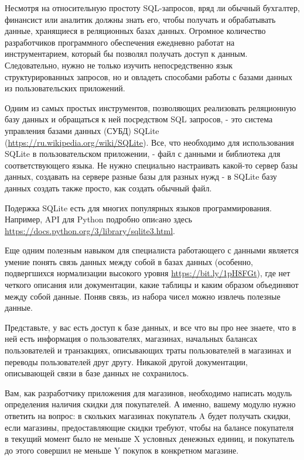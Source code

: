 
Несмотря на относительную простоту SQL-запросов, вряд ли обычный бухгалтер, финансист или аналитик должны знать его, чтобы получать и обрабатывать данные, хранящиеся в реляционных базах данных. Огромное количество разработчиков программного обеспечения ежедневно работат на инструментарием, который бы позволял получать доступ к данным. Следовательно, нужно не только изучить непосредственно язык структурированных запросов, но и овладеть способами работы с базами данных из пользовательских приложений.

Одним из самых простых инструментов, позволяющих реализовать реляционную базу данных и обращаться к 
ней посредством SQL запросов, - это система управления базами данных (СУБД) SQLite (\url{https://ru.wikipedia.org/wiki/SQLite}). Все, что необходимо для использования SQLite в пользовательском приложении, - файл с данными и библиотека для соответствующего языка. Не нужно специально настраивать какой-то сервер базы данных, создавать на сервере разные базы для разных нужд - в SQLite базу данных создать также просто, как создать обычный файл.

Подержка SQLite есть для многих популярных языков программирования. Например, API для Python подробно опиcано здесь\\ 
\url{https://docs.python.org/3/library/sqlite3.html}.

Еще одним полезным навыком для специалиста работающего с данными является умение понять связь данных между 
собой в базах данных (особенно, подвергшихся нормализации высокого уровня \url{https://bit.ly/1pH8FGt}), где нет четкого описания или документации, какие таблицы и каким образом объединяют между собой данные. Поняв связь, из набора чисел можно извлечь полезные данные.

Представьте, у вас есть доступ к базе данных, и все что вы про нее знаете, что в ней есть информация о пользователях, магазинах, начальных балансах пользователей и транзакциях, описывающих траты пользователей в магазинах и переводы пользователей друг другу. Никакой другой документации, описывающей связи в базе данных не сохранилось.

Вам, как разработчику приложения для магазинов, необходимо написать модуль определения наличия скидки для покупателей. А именно, вашему модулю нужно ответить на вопрос: в скольких магазинах покупатель A будет получать скидки, если магазины, предоставляющие скидки требуют, чтобы на балансе покупателя в текущий момент было не меньше X условных денежных единиц, и покупатель до этого совершил не меньше Y покупок в конкретном магазине.

